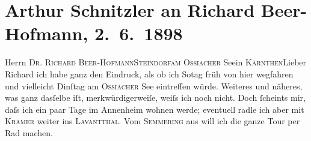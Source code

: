 

         
         \renewcommand{\erwaehntePersonen}{Personen: Richard Beer-Hofmann, Paula Beer-Hofmann, Mirjam Beer-Hofmann, Leopold Kramer}
         \renewcommand{\erwaehnteOrte}{Orte: Annenheim, IX., Alsergrund, Kärnten, Lavanttal, Ossiacher See, Semmering, Steindorf am Ossiacher See, Wien}
         \renewcommand{\erwaehnteWerke}{}
               \section[Arthur Schnitzler an Richard Beer-Hofmann, 2. 6. 1898]{ Arthur Schnitzler an Richard Beer-Hofmann, 2. 6. 1898}\nopagebreak{}\rehead{ }\begin{ledgroupsized}[t]{13cm}\normalsize\beginnumbering \toendnotes[C]{\smallbreak\pagebreak[2]} 
\pstart{}{\pb}Herrn \textsc{Dr. Richard
                     Beer-Hofmann}\pend{}\pstart{}\textsc{Steindorf}\pend{}\pstart{}\textsc{am}{ }\textsc{Ossiacher}{ }See\pend{}\pstart{}in \textsc{Kärnthen}\pend{}{\bigskip}\pstart{}{\pb}Lieber Richard\pend\pstart
           ich habe ganz den Eindruck, als ob ich So{\geminationn}tag{ }früh von hier wegfahren und vielleicht Dinſtag am \textsc{Ossiacher}{ }See eintreffen würde. {\pb}Weiteres und näheres, was ganz dasſelbe iſt,
               merkwürdigerweiſe, weiſs ich noch nicht. Doch ſcheints mir, daſs ich ein paar Tage im
                  Annenheim wohnen werde; eventuell radle ich
               aber mit \textsc{Kramer} weiter ins \textsc{Lavantthal}. {\pb}Vom \textsc{Semmering} aus will ich die ganze Tour per Rad machen.\pend

\end{ledgroupsized}
